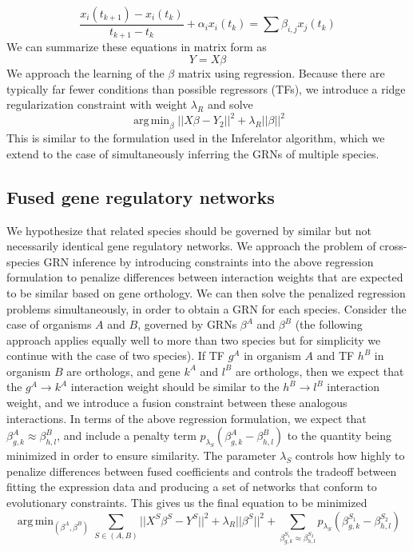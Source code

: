 \documentclass[11pt]{article}
\DeclareMathOperator*{\argmin}{arg\,min}
\begin{document}
\begin{equation}
\frac{x_i(t_{k+1})-x_i(t_k)}{t_{k+1}-t_k} + \alpha_{i}x_{i}(t_k)= \sum \beta_{i,j}x_{j}(t_k)
\end{equation}
\noindent We can summarize these equations in matrix form as
\begin{equation}
Y = X \beta 
\end{equation}
\noindent We approach the learning of the $\beta$ matrix using regression. Because there are typically far fewer conditions than possible regressors (TFs), we introduce a ridge regularization constraint with weight $\lambda_R$ and solve
\begin{equation}
\argmin_\beta\vert \vert X\beta - Y_2 \vert \vert ^2 + \lambda_R \vert \vert \beta \vert \vert ^2
\end{equation}
This is similar to the formulation used in the Inferelator algorithm, which we extend to the case of simultaneously inferring the GRNs of multiple species. 

\subsection{Fused gene regulatory networks}
We hypothesize that related species should be governed by similar but not necessarily identical gene regulatory networks. We approach the problem of cross-species GRN inference by introducing constraints into the above regression formulation to penalize differences between interaction weights that are expected to be similar based on gene orthology. We can then solve the penalized regression problems simultaneously, in order to obtain a GRN for each species. Consider the case of organisms $A$ and $B$, governed by GRNs $\beta^A$ and $\beta^B$ (the following approach applies equally well to more than two species but for simplicity we continue with the case of two species). If TF $g^A$ in organism $A$ and TF $h^B$ in organism $B$ are orthologs, and gene $k^A$ and $l^B$ are orthologs, then we expect that the $g^A \rightarrow k^A$ interaction weight should be similar to the $h^B \rightarrow l^B$ interaction weight, and we introduce a fusion constraint between these analogous interactions. In terms of the above regression formulation, we expect that $\beta^A_{g,k} \approx \beta^B_{h,l}$, and include a penalty term $p_{\lambda_S}(\beta^A_{g,k} - \beta^B_{h,l})$ to the quantity being minimized in order to ensure similarity. The parameter $\lambda_S$ controls how highly to penalize differences between fused coefficients and controls the tradeoff between fitting the expression data and producing a set of networks that conform to evolutionary constraints. This gives us the final equation to be minimized 
\begin{equation}
\argmin_{(\beta^A, \beta^B)} \displaystyle\sum_{S \in (A, B)} \vert \vert X^S\beta^S - Y^S \vert \vert ^2 + \lambda_R \vert \vert \beta^S \vert \vert ^2 + \displaystyle \sum_{\beta^{S_1}_{g,k} \approx \beta^{S_2}_{h,l}} p_{\lambda_S}(\beta^{S_1}_{g,k} - \beta^{S_2}_{h,l})
\end{equation}
\end{document}
